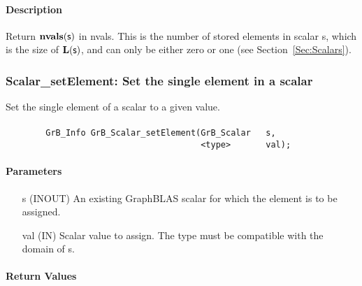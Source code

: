\paragraph{Description}


Return $\mathbf{nvals}({\sf s})$ in {\sf nvals}. This is the number of stored 
elements in scalar {\sf s}, which is the size of $\mathbf{L}({\sf s})$, and
can only be either zero or one (see Section~\ref{Sec:Scalars}).

\subsubsection{{\sf Scalar\_setElement}: Set the single element in a scalar}

Set the single element of a scalar to a given value.

\paragraph{\syntax}

\begin{verbatim}
        GrB_Info GrB_Scalar_setElement(GrB_Scalar   s,
                                       <type>       val);
\end{verbatim}

\paragraph{Parameters}

\begin{itemize}[leftmargin=1.1in]
    \item[{\sf s}]   ({\sf INOUT}) An existing GraphBLAS scalar for which the 
    element is to be assigned.

    \item[{\sf val}]   ({\sf IN}) Scalar value to assign.  The type must
    be compatible with the domain of {\sf s}.
\end{itemize}

\paragraph{Return Values}

